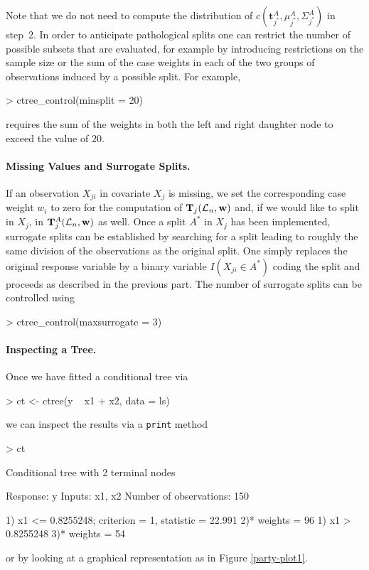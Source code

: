\documentclass[letter]{article}
\newcommand{\bft}{\mathbf{t}}
\begin{document}
Note that we do not need to compute the distribution of 
$c(\bft_{j^*}^A, \mu_{j^*}^A, \Sigma_{j^*}^A)$ in step~2. 
In order to anticipate pathological splits one can restrict the number of
possible subsets that are evaluated, for example by introducing restrictions
on the sample size or the sum of the case weights in each of the two groups
of observations induced by a possible split. For example,
\begin{Schunk}
\begin{Sinput}
> ctree_control(minsplit = 20)
\end{Sinput}
\end{Schunk}
requires the sum of the weights in both the left and right daughter 
node to exceed the value of $20$.

\paragraph{Missing Values and Surrogate Splits.}

If an observation $X_{ji}$ in covariate $X_j$ is missing, we set the
corresponding case weight $w_i$ to zero for the computation of $\mathbf{T}_j(\mathcal{L}_n, \mathbf{w})$
and, if we would like to split in $X_j$, in $\mathbf{T}_{j}^A(\mathcal{L}_n, \mathbf{w})$ as well.
Once a split $A^*$ in $X_j$ has been implemented, surrogate splits can be 
established by
searching for a split leading to roughly the same division of the
observations as the original split. One simply replaces the original
response variable by a binary variable $I(X_{ji} \in A^*)$ coding the
split and proceeds as described in the previous part. The number of
surrogate splits can be controlled using
\begin{Schunk}
\begin{Sinput}
> ctree_control(maxsurrogate = 3)
\end{Sinput}
\end{Schunk}

\paragraph{Inspecting a Tree.}

Once we have fitted a conditional tree via
\begin{Schunk}
\begin{Sinput}
> ct <- ctree(y ~ x1 + x2, data = ls)
\end{Sinput}
\end{Schunk}
we can inspect the results via a \texttt{print} method
\begin{Schunk}
\begin{Sinput}
> ct
\end{Sinput}
\begin{Soutput}
	 Conditional tree with 2 terminal nodes

Response:  y 
Inputs:  x1, x2 
Number of observations:  150 

1) x1 <= 0.8255248; criterion = 1, statistic = 22.991
  2)*  weights = 96 
1) x1 > 0.8255248
  3)*  weights = 54 
\end{Soutput}
\end{Schunk}
or by looking at a graphical representation as in Figure \ref{party-plot1}.
\end{document}
